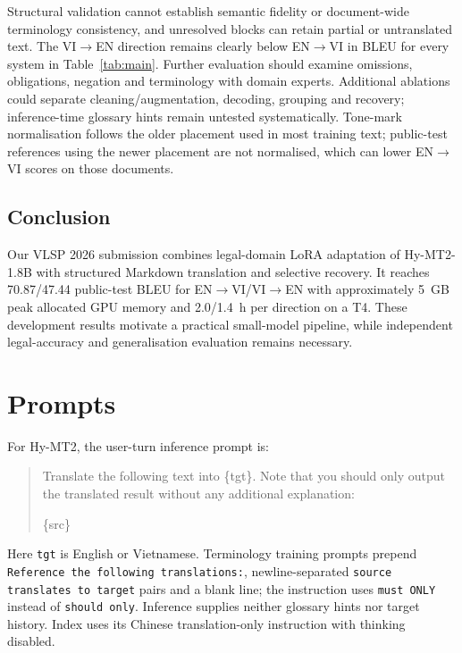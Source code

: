 \documentclass[11pt]{article}
\newcommand{\envi}{EN$\rightarrow$VI}
\newcommand{\vien}{VI$\rightarrow$EN}
\begin{document}
Structural validation cannot establish semantic fidelity or document-wide terminology consistency, and unresolved blocks can retain partial or untranslated text. The \vien{} direction remains clearly below \envi{} in BLEU for every system in Table~\ref{tab:main}. Further evaluation should examine omissions, obligations, negation and terminology with domain experts. Additional ablations could separate cleaning/augmentation, decoding, grouping and recovery; inference-time glossary hints remain untested systematically. Tone-mark normalisation follows the older placement used in most training text; public-test references using the newer placement are not normalised, which can lower \envi{} scores on those documents.

\begin{samepage}
\section{Conclusion}
Our VLSP 2026 submission combines legal-domain LoRA adaptation of Hy-MT2-1.8B with structured Markdown translation and selective recovery. It reaches 70.87/47.44 public-test BLEU for \envi{}/\vien{} with approximately 5~GB peak allocated GPU memory and 2.0/1.4~h per direction on a T4. These development results motivate a practical small-model pipeline, while independent legal-accuracy and generalisation evaluation remains necessary.

\end{samepage}



\clearpage
\appendix
\section{Prompts}\label{app:prompts}
For Hy-MT2, the user-turn inference prompt is:
\begin{quote}\small\ttfamily\raggedright
Translate the following text into \{tgt\}. Note that you should only output the translated result without any additional explanation:\par\medskip
\{src\}
\end{quote}
Here \texttt{tgt} is English or Vietnamese. Terminology training prompts prepend \texttt{Reference the following translations:}, newline-separated \texttt{source translates to target} pairs and a blank line; the instruction uses \texttt{must ONLY} instead of \texttt{should only}. Inference supplies neither glossary hints nor target history. Index uses its Chinese translation-only instruction with thinking disabled.
\end{document}

